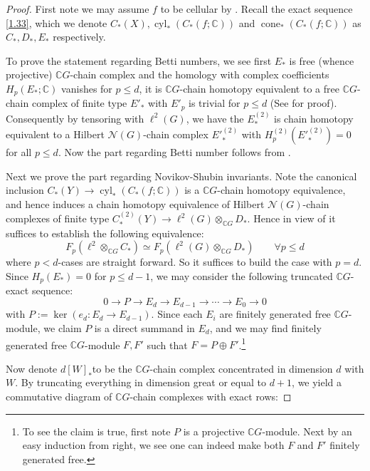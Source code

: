 \documentclass[11pt]{report}
\theoremstyle{definition}
\theoremstyle{plain}
\DeclareMathOperator{\cone}{cone}
\DeclareMathOperator{\cyl}{cyl}
\newcommand{\complex}{\mathbb{C}}
\newcommand{\vna}{\mathcal{N}}
\begin{document}
\begin{proof}
	First note we may assume $f$ to be cellular by . Recall the exact sequence \ref{1.33}, which we denote $C_*(X), \cyl_*(C_*(f; \complex))$ and $\cone_*(C_*(f; \complex))$ as $C_*, D_*, E_*$ respectively.
	\par To prove the statement regarding Betti numbers, we see first $E_*$ is free (whence projective) $\complex G$-chain complex and the homology with complex coefficients $H_p(E_*;\complex)$ vanishes for $p\leq d$, it is $\complex G$-chain homotopy equivalent to a free $\complex G$-chain complex of finite type $E'_*$ with $E'_p$ is trivial for $p\leq d$ (See \cite[Chapter~I, Corollary 7.7]{brown2012} for proof). Consequently by tensoring with $\ell^2(G)$, we have the $E^{(2)}_*$ is chain homotopy equivalent to a Hilbert $\vna(G)$-chain complex $E'^{(2)}_*$  with $H_p^{(2)}(E'^{(2)}_*)=0$ for all $p\leq d$. Now the part regarding Betti number follows from .
	\par Next we prove the part regarding Novikov-Shubin invariants. Note the canonical inclusion $C_*(Y)\to \cyl_*(C_*(f; \complex))$ is a $\complex G$-chain homotopy equivalence, and hence induces a chain homotopy equivalence of Hilbert $\vna(G)$-chain complexes of finite type $C_*^{(2)}(Y)\to \ell^2(G)\otimes_{\complex G}D_*$. Hence in view of  it suffices to establish the following equivalence:
	\begin{equation*}
	F_p(\ell^2\otimes_{\complex G} C_*)\simeq F_p(\ell^2(G)\otimes_{\complex G} D_*) \qquad \forall p\leq d
	\end{equation*}
	where $p<d$-cases are straight forward. So it suffices to build the case with $p=d$. Since $H_p(E_*)=0$ for $p\leq d-1$, we may consider the following truncated $\complex G$-exact sequence:
	\begin{equation*}
	0\to P\to E_d\to E_{d-1}\to \cdots \to E_0\to 0
	\end{equation*}
	with $P:=\ker (e_d:E_d\to E_{d-1})$. Since each $E_i$ are finitely generated free $\complex G$-module, we claim $P$ is a direct summand in $E_d$, and we may find finitely generated free $\complex G$-module $F, F'$ such that $F=P\oplus F'$.\footnote{To see the claim is true, first note $P$ is a projective $\complex G$-module. Next by an easy induction from right, we see one can indeed make both $F$ and $F'$ finitely generated free.}
	\par Now denote $d[W]_*$to be the $\complex G$-chain complex concentrated in dimension $d$ with $W$. By truncating everything in dimension great or equal to $d+1$, we yield a commutative diagram of $\complex G$-chain complexes with exact rows:

\end{proof}
\end{document}
